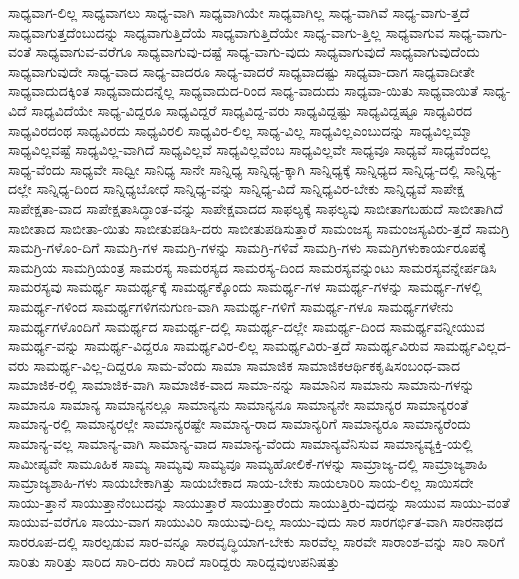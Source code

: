{ಸಾಧ್ಯವಾಗ-ಲಿಲ್ಲ
ಸಾಧ್ಯವಾಗಲು
ಸಾಧ್ಯ-ವಾಗಿ
ಸಾಧ್ಯವಾಗಿಯೇ
ಸಾಧ್ಯವಾಗಿಲ್ಲ
ಸಾಧ್ಯ-ವಾಗಿವೆ
ಸಾಧ್ಯ-ವಾಗು-ತ್ತದೆ
ಸಾಧ್ಯವಾಗುತ್ತದೆಂಬುದನ್ನು
ಸಾಧ್ಯವಾಗುತ್ತಿದೆಯೆ
ಸಾಧ್ಯವಾಗುತ್ತಿದೆಯೇ
ಸಾಧ್ಯ-ವಾಗು-ತ್ತಿಲ್ಲ
ಸಾಧ್ಯವಾಗುವ
ಸಾಧ್ಯ-ವಾಗು-ವಂತೆ
ಸಾಧ್ಯವಾಗುವ-ವರೆಗೂ
ಸಾಧ್ಯವಾಗುವು-ದಷ್ಟೆ
ಸಾಧ್ಯ-ವಾಗು-ವುದು
ಸಾಧ್ಯವಾಗುವುದೆ
ಸಾಧ್ಯವಾಗುವುದೆಂದು
ಸಾಧ್ಯವಾಗುವುದೇ
ಸಾಧ್ಯ-ವಾದ
ಸಾಧ್ಯ-ವಾದರೂ
ಸಾಧ್ಯ-ವಾದರೆ
ಸಾಧ್ಯವಾದಷ್ಟು
ಸಾಧ್ಯವಾ-ದಾಗ
ಸಾಧ್ಯವಾದೀತೇ
ಸಾಧ್ಯವಾದುದಕ್ಕಿಂತ
ಸಾಧ್ಯವಾದುದನ್ನೆಲ್ಲ
ಸಾಧ್ಯವಾದುದ-ರಿಂದ
ಸಾಧ್ಯ-ವಾದುದು
ಸಾಧ್ಯವಾ-ಯಿತು
ಸಾಧ್ಯವಾಯಿತೆ
ಸಾಧ್ಯ-ವಿದೆ
ಸಾಧ್ಯವಿದೆಯೇ
ಸಾಧ್ಯ-ವಿದ್ದರೂ
ಸಾಧ್ಯವಿದ್ದರೆ
ಸಾಧ್ಯವಿದ್ದ-ವರು
ಸಾಧ್ಯವಿದ್ದಷ್ಟು
ಸಾಧ್ಯವಿದ್ದಷ್ಟೂ
ಸಾಧ್ಯವಿರದ
ಸಾಧ್ಯವಿರದಂಥ
ಸಾಧ್ಯವಿರದು
ಸಾಧ್ಯವಿರಲಿ
ಸಾಧ್ಯವಿರ-ಲಿಲ್ಲ
ಸಾಧ್ಯ-ವಿಲ್ಲ
ಸಾಧ್ಯವಿಲ್ಲಎಂಬುದನ್ನು
ಸಾಧ್ಯವಿಲ್ಲಮ್ಮಾ
ಸಾಧ್ಯವಿಲ್ಲವಷ್ಟೆ
ಸಾಧ್ಯವಿಲ್ಲ-ವಾಗಿದೆ
ಸಾಧ್ಯವಿಲ್ಲವೆ
ಸಾಧ್ಯವಿಲ್ಲವೆಂಬ
ಸಾಧ್ಯವಿಲ್ಲವೇ
ಸಾಧ್ಯವೂ
ಸಾಧ್ಯವೆ
ಸಾಧ್ಯವೆಂದಲ್ಲ
ಸಾಧ್ಯ-ವೆಂದು
ಸಾಧ್ಯವೇ
ಸಾಧ್ವೀ
ಸಾನಿಧ್ಯ
ಸಾನೇ
ಸಾನ್ನಿಧ್ಯ
ಸಾನ್ನಿಧ್ಯ-ಕ್ಕಾಗಿ
ಸಾನ್ನಿಧ್ಯಕ್ಕೆ
ಸಾನ್ನಿಧ್ಯದ
ಸಾನ್ನಿಧ್ಯ-ದಲ್ಲಿ
ಸಾನ್ನಿಧ್ಯ-ದಲ್ಲೇ
ಸಾನ್ನಿಧ್ಯ-ದಿಂದ
ಸಾನ್ನಿಧ್ಯಬೋಧೆ
ಸಾನ್ನಿಧ್ಯ-ವನ್ನು
ಸಾನ್ನಿಧ್ಯ-ವಿದೆ
ಸಾನ್ನಿಧ್ಯವಿರ-ಬೇಕು
ಸಾನ್ನಿಧ್ಯವೆ
ಸಾಪೇಕ್ಷ
ಸಾಪೇಕ್ಷತಾ-ವಾದ
ಸಾಪೇಕ್ಷತಾಸಿದ್ಧಾಂತ-ವನ್ನು
ಸಾಪೇಕ್ಷವಾದದ
ಸಾಫಲ್ಯಕ್ಕೆ
ಸಾಫಲ್ಯವು
ಸಾಬೀತಾಗಬಹುದೆ
ಸಾಬೀತಾಗಿದೆ
ಸಾಬೀತಾದ
ಸಾಬೀತಾ-ಯಿತು
ಸಾಬೀತುಪಡಿಸಿ-ದರು
ಸಾಬೀತುಪಡಿಸುತ್ತಾರೆ
ಸಾಮಂಜಸ್ಯ
ಸಾಮಂಜಸ್ಯವಿರು-ತ್ತದೆ
ಸಾಮಗ್ರಿ
ಸಾಮಗ್ರಿ-ಗಳೊಂ-ದಿಗೆ
ಸಾಮಗ್ರಿ-ಗಳ
ಸಾಮಗ್ರಿ-ಗಳನ್ನು
ಸಾಮಗ್ರಿ-ಗಳಿವೆ
ಸಾಮಗ್ರಿ-ಗಳು
ಸಾಮಗ್ರಿಗಳುಕಾರ್ಯರೂಪಕ್ಕೆ
ಸಾಮಗ್ರಿಯ
ಸಾಮಗ್ರಿಯಂತ್ರ
ಸಾಮರಸ್ಯ
ಸಾಮರಸ್ಯದ
ಸಾಮರಸ್ಯ-ದಿಂದ
ಸಾಮರಸ್ಯವನ್ನುಂಟು
ಸಾಮರಸ್ಯವನ್ನೇರ್ಪಡಿಸಿ
ಸಾಮರಸ್ಯವು
ಸಾಮರ್ಥ್ಯ
ಸಾಮರ್ಥ್ಯಕ್ಕೆ
ಸಾಮರ್ಥ್ಯಕ್ಕೊಂದು
ಸಾಮರ್ಥ್ಯ-ಗಳ
ಸಾಮರ್ಥ್ಯ-ಗಳನ್ನು
ಸಾಮರ್ಥ್ಯ-ಗಳಲ್ಲಿ
ಸಾಮರ್ಥ್ಯ-ಗಳಿಂದ
ಸಾಮರ್ಥ್ಯಗಳಿಗನುಗುಣ-ವಾಗಿ
ಸಾಮರ್ಥ್ಯ-ಗಳಿಗೆ
ಸಾಮರ್ಥ್ಯ-ಗಳೂ
ಸಾಮರ್ಥ್ಯಗಳೇನು
ಸಾಮರ್ಥ್ಯಗಳೊಂದಿಗೆ
ಸಾಮರ್ಥ್ಯದ
ಸಾಮರ್ಥ್ಯ-ದಲ್ಲಿ
ಸಾಮರ್ಥ್ಯ-ದಲ್ಲೇ
ಸಾಮರ್ಥ್ಯ-ದಿಂದ
ಸಾಮರ್ಥ್ಯವನ್ನೀಯುವ
ಸಾಮರ್ಥ್ಯ-ವನ್ನು
ಸಾಮರ್ಥ್ಯ-ವಿದ್ದರೂ
ಸಾಮರ್ಥ್ಯವಿರ-ಲಿಲ್ಲ
ಸಾಮರ್ಥ್ಯವಿರು-ತ್ತದೆ
ಸಾಮರ್ಥ್ಯವಿರುವ
ಸಾಮರ್ಥ್ಯವಿಲ್ಲದ-ವರು
ಸಾಮರ್ಥ್ಯ-ವಿಲ್ಲ-ದಿದ್ದರೂ
ಸಾಮ-ವೆಂದು
ಸಾಮಾ
ಸಾಮಾಜಿಕ
ಸಾಮಾಜಿಕಆರ್ಥಿಕಕೃಷಿಸಂಬಂಧ-ವಾದ
ಸಾಮಾಜಿಕ-ರಲ್ಲಿ
ಸಾಮಾಜಿಕ-ವಾಗಿ
ಸಾಮಾಜಿಕ-ವಾದ
ಸಾಮಾ-ನನ್ನು
ಸಾಮಾನಿನ
ಸಾಮಾನು
ಸಾಮಾನು-ಗಳನ್ನು
ಸಾಮಾನೂ
ಸಾಮಾನ್ಯ
ಸಾಮಾನ್ಯನಲ್ಲೂ
ಸಾಮಾನ್ಯನು
ಸಾಮಾನ್ಯನೂ
ಸಾಮಾನ್ಯನೇ
ಸಾಮಾನ್ಯರ
ಸಾಮಾನ್ಯರಂತೆ
ಸಾಮಾನ್ಯ-ರಲ್ಲಿ
ಸಾಮಾನ್ಯರಲ್ಲೇ
ಸಾಮಾನ್ಯರಷ್ಟೇ
ಸಾಮಾನ್ಯ-ರಾದ
ಸಾಮಾನ್ಯರಿಗೆ
ಸಾಮಾನ್ಯರೂ
ಸಾಮಾನ್ಯರೆಂದು
ಸಾಮಾನ್ಯ-ವಲ್ಲ
ಸಾಮಾನ್ಯ-ವಾಗಿ
ಸಾಮಾನ್ಯ-ವಾದ
ಸಾಮಾನ್ಯ-ವೆಂದು
ಸಾಮಾನ್ಯವೆನಿಸುವ
ಸಾಮಾನ್ಯವ್ಯಕ್ತಿ-ಯಲ್ಲಿ
ಸಾಮೀಪ್ಯವೇ
ಸಾಮೂಹಿಕ
ಸಾಮ್ಯ
ಸಾಮ್ಯವು
ಸಾಮ್ಯವೂ
ಸಾಮ್ಯಹೋಲಿಕೆ-ಗಳನ್ನು
ಸಾಮ್ರಾಜ್ಯ-ದಲ್ಲಿ
ಸಾಮ್ರಾಜ್ಯಶಾಹಿ
ಸಾಮ್ರಾಜ್ಯಶಾಹಿ-ಗಳು
ಸಾಯಬೇಕಾಗಿತ್ತು
ಸಾಯಬೇಕಾದ
ಸಾಯ-ಬೇಕು
ಸಾಯಲಾರಿರಿ
ಸಾಯ-ಲಿಲ್ಲ
ಸಾಯಿಸದೇ
ಸಾಯು-ತ್ತಾನೆ
ಸಾಯುತ್ತಾನೆಂಬುದನ್ನು
ಸಾಯುತ್ತಾರೆ
ಸಾಯುತ್ತಾರೆಂದು
ಸಾಯುತ್ತಿರು-ವುದನ್ನು
ಸಾಯುವ
ಸಾಯು-ವಂತೆ
ಸಾಯುವ-ವರೆಗೂ
ಸಾಯು-ವಾಗ
ಸಾಯುವಿರಿ
ಸಾಯುವು-ದಿಲ್ಲ
ಸಾಯು-ವುದು
ಸಾರ
ಸಾರಗರ್ಭಿತ-ವಾಗಿ
ಸಾರನಾಥದ
ಸಾರರೂಪ-ದಲ್ಲಿ
ಸಾರಲ್ಪಡುವ
ಸಾರ-ವನ್ನೂ
ಸಾರವೃದ್ಧಿಯಾಗ-ಬೇಕು
ಸಾರವೆಲ್ಲ
ಸಾರವೇ
ಸಾರಾಂಶ-ವನ್ನು
ಸಾರಿ
ಸಾರಿಗೆ
ಸಾರಿತು
ಸಾರಿತ್ತು
ಸಾರಿದ
ಸಾರಿ-ದರು
ಸಾರಿದೆ
ಸಾರಿದ್ದರು
ಸಾರಿದ್ದವುಉಪನಿಷತ್ತು
}
